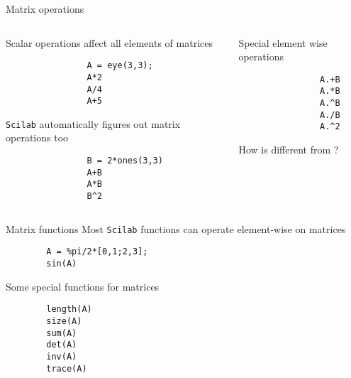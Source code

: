 \documentclass[%
    10pt,
    xcolor={dvipsnames},
    compress, %
]{beamer}
\newcommand{\scilab}{\texttt{Scilab}}
\begin{document}
\begin{frame}[fragile]{Matrix operations}
    \begin{columns}
        \begin{column}{0.49\linewidth}
            Scalar operations affect all elements of matrices
            \begin{lstlisting}
                A = eye(3,3);
                A*2
                A/4
                A+5
            \end{lstlisting}
            \scilab{} automatically figures out matrix operations too
            \begin{lstlisting}
                B = 2*ones(3,3)
                A+B
                A*B
                B^2
            \end{lstlisting}
        \end{column}
        \begin{column}{0.49\linewidth}
            Special element wise operations
            \begin{lstlisting}
                A.+B
                A.*B
                A.^B
                A./B
                A.^2
            \end{lstlisting}
            How is  different from ?
        \end{column}
    \end{columns}
\end{frame}

\begin{frame}[fragile]{Matrix functions}
    Most \scilab{} functions can operate element-wise on matrices
    \begin{lstlisting}
        A = %pi/2*[0,1;2,3];
        sin(A)
    \end{lstlisting}
    Some special functions for matrices
    \begin{lstlisting}
        length(A)
        size(A)
        sum(A)
        det(A)
        inv(A)
        trace(A)
    \end{lstlisting}
\end{frame}
\end{document}
